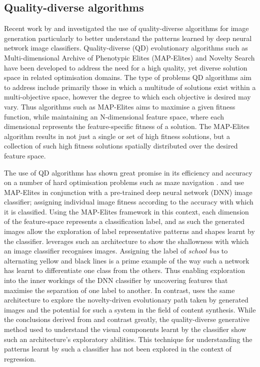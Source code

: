 \documentclass{article}
\begin{document}
\subsection{Quality-diverse algorithms}

Recent work by \citet{nguyen2015innovation} and \citet{nguyen2015deep} investigated the use of quality-diverse algorithms for image generation particularly to better understand the patterns learned by deep neural network image classifiers.
Quality-diverse (QD) evolutionary algorithms such as Multi-dimensional Archive of Phenotypic Elites (MAP-Elites) \citep{mouret2015illuminating} and Novelty Search \citep{lehman2008exploiting, lehman2011abandoning} have been developed to address the need for a high quality, yet diverse solution space in related optimisation domains.
The type of problems QD algorithms aim to address include primarily those in which a multitude of solutions exist within a multi-objective space, however the degree to which each objective is desired may vary.
Thus algorithms such as MAP-Elites aims to maximise a given fitness function, while maintaining an N-dimensional feature space, where each dimensional represents the feature-specific fitness of a solution.
The MAP-Elites algorithm results in not just a single or set of high fitness solutions, but a collection of such high fitness solutions spatially distributed over the desired feature space.

The use of QD algorithms has shown great promise in its efficiency and accuracy on a number of hard optimisation problems \citep{pugh2016quality} such as maze navigation \citep{lehman2011abandoning}.
\citet{nguyen2015deep} and \citet{nguyen2015innovation} use MAP-Elites in conjunction with a pre-trained deep neural network (DNN) image classifier; assigning individual image fitness according to the accuracy with which it is classified.
Using the MAP-Elites framework in this context, each dimension of the feature-space represents a classification label, and as such the generated images allow the exploration of label representative patterns and shapes learnt by the classifier.
\citet{nguyen2015deep} leverages such an architecture to show the shallowness with which an image classifier recognises images.
Assigning the label of \textit{school bus} to alternating yellow and black lines is a prime example of the way such a network has learnt to differentiate one class from the others.
Thus enabling exploration into the inner workings of the DNN classifier by uncovering features that maximise the separation of one label to another.
In contrast, \citet{nguyen2015innovation} uses the same architecture to explore the novelty-driven evolutionary path taken by generated images and the potential for such a system in the field of content synthesis.
While the conclusions derived from \citet{nguyen2015innovation} and \citet{nguyen2015deep} contrast greatly, the quality-diverse generative method used to understand the visual components learnt by the classifier show such an architecture's exploratory abilities.
This technique for understanding the patterns learnt by such a classifier has not been explored in the context of regression.
\end{document}
